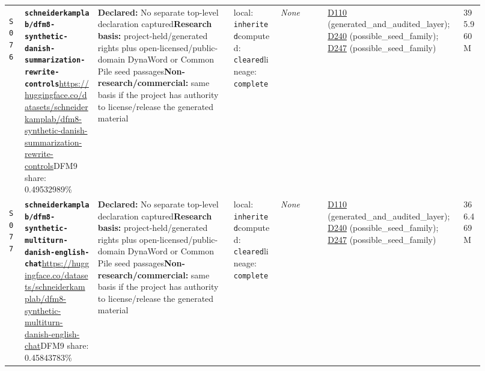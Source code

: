 \documentclass[9pt,a4paper]{article}
\newcommand{\srcid}[1]{\hypertarget{src:#1}{\texttt{#1}}}
\begin{document}
\begin{landscape}
\begin{longtable}{@{}L{0.03\linewidth}L{0.14\linewidth}L{0.26\linewidth}L{0.09\linewidth}L{0.09\linewidth}L{0.265\linewidth}L{0.045\linewidth}@{}}
\srcid{S076} & \textbf{\nolinkurl{schneiderkamplab/dfm8-synthetic-danish-summarization-rewrite-controls}}\newline \url{https://huggingface.co/datasets/schneiderkamplab/dfm8-synthetic-danish-summarization-rewrite-controls}\newline DFM9 share: 0.49532989\% & \textbf{Declared:} No separate top-level declaration captured\newline \textbf{Research basis:} project-held/generated rights plus open-licensed/public-domain DynaWord or Common Pile seed passages\newline \textbf{Non-research/commercial:} same basis if the project has authority to license/release the generated material & local: \texttt{inherited}\newline computed: \texttt{cleared}\newline lineage: \texttt{complete} & \textit{None} & \hyperlink{dep:D110}{D110} (generated\_and\_audited\_layer); \hyperlink{dep:D240}{D240} (possible\_seed\_family); \hyperlink{dep:D247}{D247} (possible\_seed\_family) & 395.960M \\
\srcid{S077} & \textbf{\nolinkurl{schneiderkamplab/dfm8-synthetic-multiturn-danish-english-chat}}\newline \url{https://huggingface.co/datasets/schneiderkamplab/dfm8-synthetic-multiturn-danish-english-chat}\newline DFM9 share: 0.45843783\% & \textbf{Declared:} No separate top-level declaration captured\newline \textbf{Research basis:} project-held/generated rights plus open-licensed/public-domain DynaWord or Common Pile seed passages\newline \textbf{Non-research/commercial:} same basis if the project has authority to license/release the generated material & local: \texttt{inherited}\newline computed: \texttt{cleared}\newline lineage: \texttt{complete} & \textit{None} & \hyperlink{dep:D110}{D110} (generated\_and\_audited\_layer); \hyperlink{dep:D240}{D240} (possible\_seed\_family); \hyperlink{dep:D247}{D247} (possible\_seed\_family) & 366.469M \\

\end{longtable}
\end{landscape}
\end{document}
